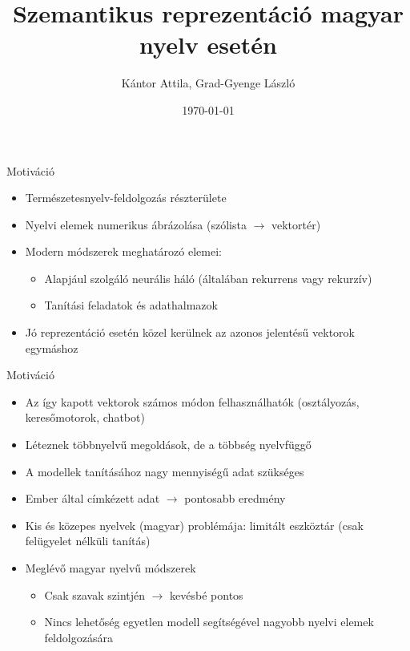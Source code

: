 \documentclass{beamer}
\author{Kántor Attila, Grad-Gyenge László}
\title{\Huge{Szemantikus reprezent\'{a}ci\'{o} magyar nyelv eset\'{e}n}}
\institute[ELTE]
\date{\small{\today}}
\begin{document}
	  

{
	\begin{frame}[plain]
		\maketitle
	\end{frame}
}

\begin{frame}{Motiváció}

\begin{itemize}
	\item Természetesnyelv-feldolgozás részterülete
	\item Nyelvi elemek numerikus ábrázolása (szólista $\rightarrow$ vektortér)
	\item Modern módszerek meghatározó elemei:
	\begin{itemize}
		\item Alapjául szolgáló neurális háló (általában rekurrens vagy rekurzív)
		\item Tanítási feladatok és adathalmazok
	\end{itemize}
	\item Jó reprezentáció esetén közel kerülnek az azonos jelentésű vektorok egymáshoz
\end{itemize}

\end{frame}

\begin{frame}{Motiváció}
	
	\begin{itemize}
		\item Az így kapott vektorok számos módon felhasználhatók (osztályozás, keresőmotorok, chatbot)
		\item Léteznek többnyelvű megoldások, de a többség nyelvfüggő
		\item A modellek tanításához nagy mennyiségű adat szükséges
		\item Ember által címkézett adat $\rightarrow$ pontosabb eredmény
		\item Kis és közepes nyelvek (magyar) problémája: limitált eszköztár (csak felügyelet nélküli tanítás)
		\item Meglévő magyar nyelvű módszerek
		\begin{itemize}
			\item Csak szavak szintjén $\rightarrow$ kevésbé pontos
			\item Nincs lehetőség egyetlen modell segítségével nagyobb nyelvi elemek feldolgozására
		\end{itemize}
	\end{itemize}
	
\end{frame}
\end{document}
